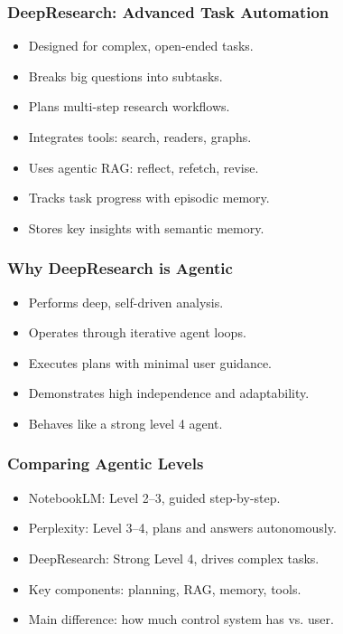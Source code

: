\begin{frame}[fragile]\frametitle{DeepResearch: Advanced Task Automation}
    \begin{itemize}
        \item Designed for complex, open-ended tasks.
        \item Breaks big questions into subtasks.
        \item Plans multi-step research workflows.
        \item Integrates tools: search, readers, graphs.
        \item Uses agentic RAG: reflect, refetch, revise.
        \item Tracks task progress with episodic memory.
        \item Stores key insights with semantic memory.
    \end{itemize}
\end{frame}

\begin{frame}[fragile]\frametitle{Why DeepResearch is Agentic}
    \begin{itemize}
        \item Performs deep, self-driven analysis.
        \item Operates through iterative agent loops.
        \item Executes plans with minimal user guidance.
        \item Demonstrates high independence and adaptability.
        \item Behaves like a strong level 4 agent.
    \end{itemize}
\end{frame}

\begin{frame}[fragile]\frametitle{Comparing Agentic Levels}
    \begin{itemize}
        \item NotebookLM: Level 2–3, guided step-by-step.
        \item Perplexity: Level 3–4, plans and answers autonomously.
        \item DeepResearch: Strong Level 4, drives complex tasks.
        \item Key components: planning, RAG, memory, tools.
        \item Main difference: how much control system has vs. user.
    \end{itemize}
\end{frame}


